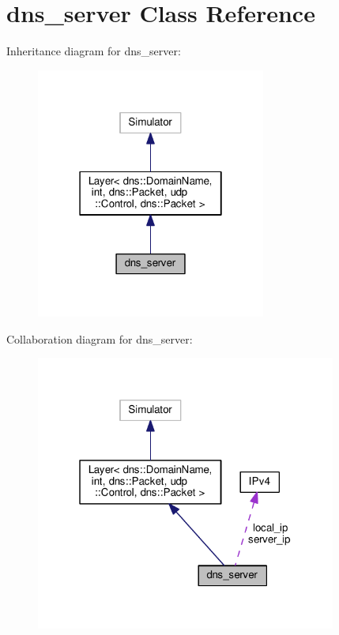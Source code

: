 \hypertarget{classdns__server}{}\section{dns\+\_\+server Class Reference}
\label{classdns__server}


Inheritance diagram for dns\+\_\+server\+:\nopagebreak
\begin{figure}[H]
\begin{center}
\leavevmode
\includegraphics[width=214pt]{classdns__server__inherit__graph}
\end{center}
\end{figure}


Collaboration diagram for dns\+\_\+server\+:
\nopagebreak
\begin{figure}[H]
\begin{center}
\leavevmode
\includegraphics[width=280pt]{classdns__server__coll__graph}
\end{center}
\end{figure}
